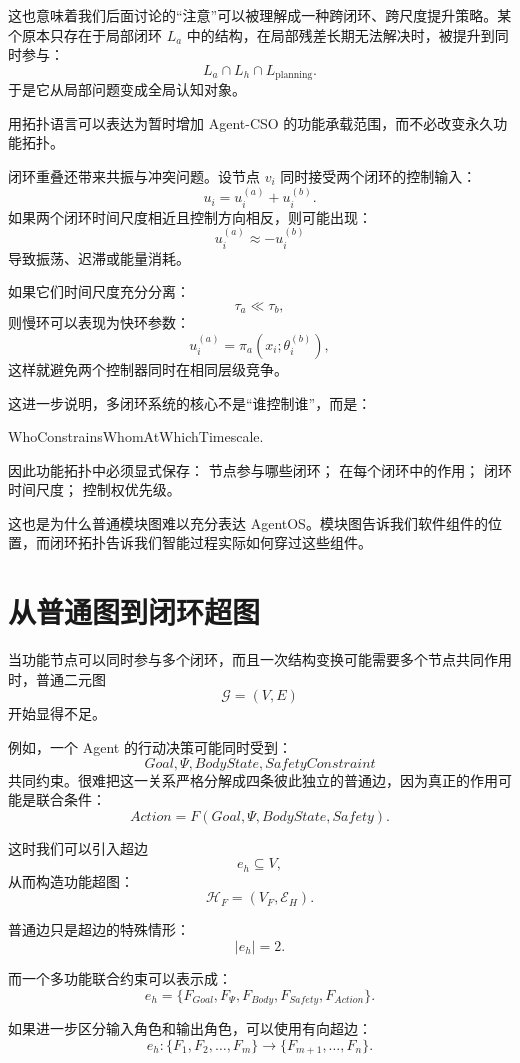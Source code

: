 这也意味着我们后面讨论的“注意”可以被理解成一种跨闭环、跨尺度提升策略。某个原本只存在于局部闭环 $L_a$ 中的结构，在局部残差长期无法解决时，被提升到同时参与：
\[
L_a
\cap
L_h
\cap
L_{\mathrm{planning}}.
\]
于是它从局部问题变成全局认知对象。

用拓扑语言可以表达为暂时增加 Agent-CSO 的功能承载范围，而不必改变永久功能拓扑。

闭环重叠还带来共振与冲突问题。设节点 $v_i$ 同时接受两个闭环的控制输入：
\[
u_i
=
u_i^{(a)}+u_i^{(b)}.
\]
如果两个闭环时间尺度相近且控制方向相反，则可能出现：
\[
u_i^{(a)}\approx -u_i^{(b)}
\]
导致振荡、迟滞或能量消耗。

如果它们时间尺度充分分离：
\[
\tau_a\ll\tau_b,
\]
则慢环可以表现为快环参数：
\[
u_i^{(a)}
=
\pi_a
\left(
x_i;
\theta_i^{(b)}
\right),
\]
这样就避免两个控制器同时在相同层级竞争。

这进一步说明，多闭环系统的核心不是“谁控制谁”，而是：
\begin{statementbox}
WhoConstrainsWhomAtWhichTimescale.
\end{statementbox}

因此功能拓扑中必须显式保存：
节点参与哪些闭环；
在每个闭环中的作用；
闭环时间尺度；
控制权优先级。

这也是为什么普通模块图难以充分表达 AgentOS。模块图告诉我们软件组件的位置，而闭环拓扑告诉我们智能过程实际如何穿过这些组件。


\section{从普通图到闭环超图}

当功能节点可以同时参与多个闭环，而且一次结构变换可能需要多个节点共同作用时，普通二元图
\[
\mathcal G=(V,E)
\]
开始显得不足。

例如，一个 Agent 的行动决策可能同时受到：
\[
Goal,
\Psi,
BodyState,
SafetyConstraint
\]
共同约束。很难把这一关系严格分解成四条彼此独立的普通边，因为真正的作用可能是联合条件：
\[
Action
=
F
\left(
Goal,
\Psi,
BodyState,
Safety
\right).
\]

这时我们可以引入超边
\[
e_h
\subseteq V,
\]
从而构造功能超图：
\[
\boxed{
\mathcal H_F=(V_F,\mathcal E_H).
}
\]

普通边只是超边的特殊情形：
\[
|e_h|=2.
\]

而一个多功能联合约束可以表示成：
\[
e_h
=
\{
F_{Goal},
F_{\Psi},
F_{Body},
F_{Safety},
F_{Action}
\}.
\]

如果进一步区分输入角色和输出角色，可以使用有向超边：
\[
e_h:
\{F_1,F_2,\ldots,F_m\}
\rightarrow
\{F_{m+1},\ldots,F_n\}.
\]

